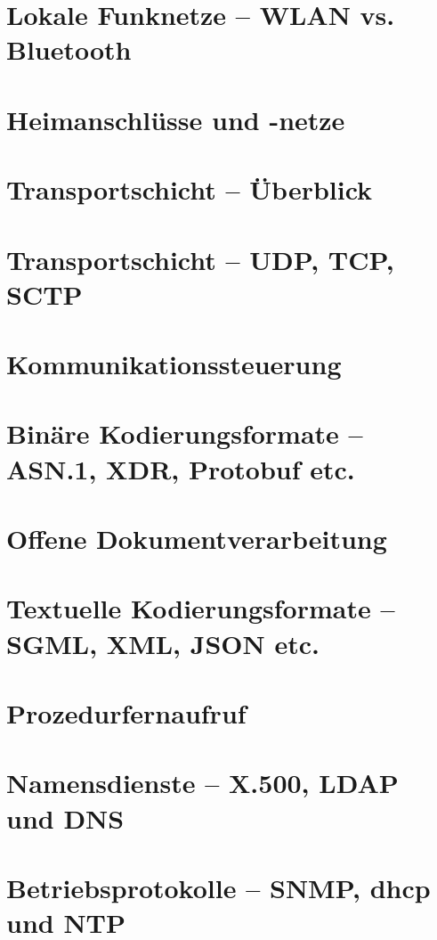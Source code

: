 \documentclass[hidelinks]{article}
\begin{document}
\section{Lokale Funknetze -- WLAN vs. Bluetooth}

\section{Heimanschlüsse und -netze}

\section{Transportschicht -- Überblick}

\section{Transportschicht -- UDP, TCP, SCTP}

\section{Kommunikationssteuerung}

\section{Binäre Kodierungsformate -- ASN.1, XDR, Protobuf etc.}

\section{Offene Dokumentverarbeitung}

\section{Textuelle Kodierungsformate -- SGML, XML, JSON etc.}

\section{Prozedurfernaufruf}

\section{Namensdienste -- X.500, LDAP und DNS}

\section{Betriebsprotokolle -- SNMP, dhcp und NTP}
\end{document}
